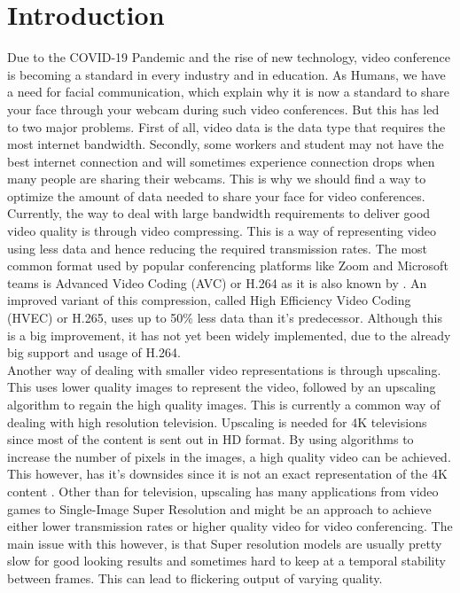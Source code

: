 \documentclass[10pt,twocolumn,letterpaper]{article}
\begin{document}
\section{Introduction}
\label{sec:intro}

Due to the COVID-19 Pandemic and the rise of new technology, video conference is becoming a standard in every industry and in education. As Humans, we have a need for facial communication, which explain why it is now a standard to share your face through your webcam during such video conferences. But this has led to two major problems. First of all, video data is the data type that requires the most internet bandwidth. Secondly, some workers and student may not have the best internet connection and will sometimes experience connection drops when many people are sharing their webcams. This is why we should find a way to optimize the amount of data needed to share your face for video conferences.\\

Currently, the way to deal with large bandwidth requirements to deliver good video quality is through video compressing. This is a way of representing video using less data and hence reducing the required transmission rates. The most common format used by popular conferencing platforms like Zoom and Microsoft teams is Advanced Video Coding (AVC) or H.264 as it is also known by \cite{AVC}\cite{h264article}. An improved variant of this compression, called High Efficiency Video Coding (HVEC) or H.265, uses up to 50\% less data than it's predecessor\cite{HVEC}. Although this is a big improvement, it has not yet been widely implemented, due to the already big support and usage of H.264.\\

Another way of dealing with smaller video representations is through upscaling. This uses lower quality images to represent the video, followed by an upscaling algorithm to regain the high quality images. This is currently a common way of dealing with high resolution television. Upscaling is needed for 4K televisions since most of the content is sent out in HD format. By using algorithms to increase the number of pixels in the images, a high quality video can be achieved. This however, has it's downsides since it is not an exact representation of the 4K content \cite{upscaling}. Other than for television, upscaling has many applications from video games to Single-Image Super Resolution and might be an approach to achieve either lower transmission rates or higher quality video for video conferencing. The main issue with this however, is that Super resolution models are usually pretty slow for good looking results and sometimes hard to keep at a temporal stability between frames. This can lead to flickering output of varying quality.\\
\end{document}
